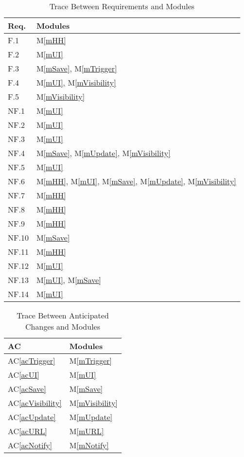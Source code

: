 \documentclass[12pt, titlepage]{article}
\newcommand{\acref}[1]{AC\ref{#1}}
\newcommand{\mref}[1]{M\ref{#1}}
\begin{document}
\begin{table}[H]
\centering
\begin{tabular}{p{} p{}}
\toprule
\textbf{Req.} & \textbf{Modules}\\
\midrule
F.1 & \mref{mHH}\\
F.2 & \mref{mUI}\\
F.3 & \mref{mSave}, \mref{mTrigger}\\
F.4 & \mref{mUI}, \mref{mVisibility}\\
F.5 & \mref{mVisibility}\\
NF.1 & \mref{mUI}\\
NF.2 & \mref{mUI}\\
NF.3 & \mref{mUI}\\
NF.4 & \mref{mSave}, \mref{mUpdate}, \mref{mVisibility}\\
NF.5 & \mref{mUI}\\
NF.6 & \mref{mHH}, \mref{mUI}, \mref{mSave}, \mref{mUpdate}, 
\mref{mVisibility}\\
NF.7 & \mref{mHH}\\
NF.8 & \mref{mHH}\\
NF.9 & \mref{mHH}\\
NF.10 & \mref{mSave}\\
NF.11 & \mref{mHH}\\
NF.12 & \mref{mUI}\\
NF.13 & \mref{mUI}, \mref{mSave}\\
NF.14 & \mref{mUI}\\
\bottomrule
\end{tabular}
\caption{Trace Between Requirements and Modules}
\label{TblRT}
\end{table}

\begin{table}[H]
\centering
\begin{tabular}{p{} p{}}
\toprule
\textbf{AC} & \textbf{Modules}\\
\midrule
\acref{acTrigger} & \mref{mTrigger}\\
\acref{acUI} & \mref{mUI}\\
\acref{acSave} & \mref{mSave}\\
\acref{acVisibility} & \mref{mVisibility}\\
\acref{acUpdate} & \mref{mUpdate}\\
\acref{acURL} & \mref{mURL}\\
\acref{acNotify} & \mref{mNotify}\\
\bottomrule
\end{tabular}
\caption{Trace Between Anticipated Changes and Modules}
\label{TblACT}
\end{table}
\end{document}
